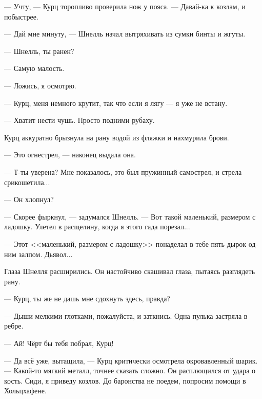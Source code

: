 \documentclass[a4paper,12pt,fleqn]{book}\usepackage{polyglossia}\setdefaultlanguage[babelshorthands=true]{russian}\setotherlanguage{english}\defaultfontfeatures{Ligatures=TeX,Mapping=tex-text}\usepackage{xcolor}\newcommand{\ml}[3]{#2}
\begin{document}
--- Учту, --- Курц торопливо проверила нож у пояса.
--- Давай-ка к козлам, и побыстрее.

--- Дай мне минуту, --- Шнелль начал вытряхивать из сумки бинты и жгуты.

--- Шнелль, ты ранен?

--- Самую малость.

\ml{$0$}
{--- Ложись, я осмотрю.}
{``Lie down, I'll take a look.''}

\ml{$0$}
{--- Курц, меня немного крутит, так что если я лягу --- я уже не встану.}
{``Kurz, I got kinda dizzy, so I lie down here, I stay down here.''}

\ml{$0$}
{--- Хватит нести чушь.}
{``Stop bullshitting.}
\ml{$0$}
{Просто подними рубаху.}
{Just lift up your shirt.''}

Курц аккуратно брызнула на рану водой из фляжки и нахмурила брови.

\ml{$0$}
{--- Это огнестрел, --- наконец выдала она.}
{``It's a gunshot wound,'' she finally said.}

\ml{$0$}
{--- Т-ты уверена?}
{``Are---are you sure?}
Мне показалось, это был пружинный самострел, и стрела срикошетила...

\ml{$0$}
{--- Он хлопнул?}
{``You heard a clap?''}

\ml{$0$}
{--- Скорее фыркнул, --- задумался Шнелль.}
{``A sniff, I'd say,'' Schnell answered.}
\ml{$0$}
{--- Вот такой маленький, размером с ладошку.}
{``Tiny like that, hand-sized.}
Улетел в расщелину, когда я этого гада порезал...

\ml{$0$}
{--- Этот <<маленький, размером с ладошку>> понаделал в тебе пять дырок одним залпом.}
{``That `tiny like that, hand-sized' stuff has made five holes in you at once.}
\ml{$0$}
{Дьявол...}
{Teufel ....''}

Глаза Шнелля расширились.
Он настойчиво скашивал глаза, пытаясь разглядеть рану.

\ml{$0$}
{--- Курц, ты же не дашь мне сдохнуть здесь, правда?}
{``Kurz, you wouldn't let me die here, would you?''}

\ml{$0$}
{--- Дыши мелкими глотками, пожалуйста, и заткнись.}
{``Take shallow breaths, please, and keep your mouth shut.}
\ml{$0$}
{Одна пулька застряла в ребре.}
{One bullet stuck in your rib.''}

\ml{$0$}
{--- Ай!}
{``Ouch!}
\ml{$0$}
{Чёрт бы тебя побрал, Курц!}
{Fuck yourself, Kurz!''}

--- Да всё уже, вытащила, --- Курц критически осмотрела окровавленный шарик.
--- Какой-то мягкий металл, точнее сказать сложно.
Он расплющился от удара о кость.
Сиди, я приведу козлов.
До баронства не поедем, попросим помощи в Хольцхафене.
\end{document}
